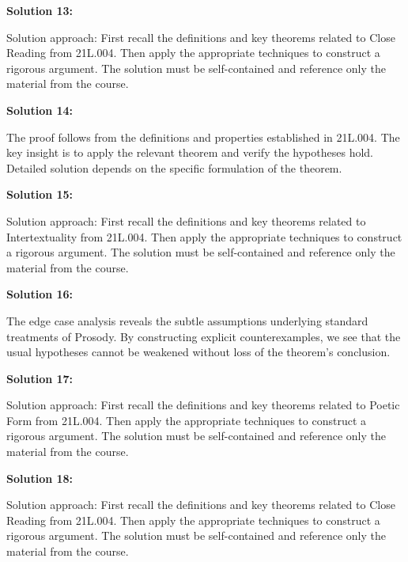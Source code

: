 \documentclass[12pt,a4paper]{exam}
\begin{document}
\vspace{0.5cm}

\textbf{Solution 13:}

Solution approach: First recall the definitions and key theorems related to Close Reading from 21L.004. Then apply the appropriate techniques to construct a rigorous argument. The solution must be self-contained and reference only the material from the course.

\vspace{0.5cm}

\textbf{Solution 14:}

The proof follows from the definitions and properties established in 21L.004. The key insight is to apply the relevant theorem and verify the hypotheses hold. Detailed solution depends on the specific formulation of the theorem.

\vspace{0.5cm}

\textbf{Solution 15:}

Solution approach: First recall the definitions and key theorems related to Intertextuality from 21L.004. Then apply the appropriate techniques to construct a rigorous argument. The solution must be self-contained and reference only the material from the course.

\vspace{0.5cm}

\textbf{Solution 16:}

The edge case analysis reveals the subtle assumptions underlying standard treatments of Prosody. By constructing explicit counterexamples, we see that the usual hypotheses cannot be weakened without loss of the theorem's conclusion.

\vspace{0.5cm}

\textbf{Solution 17:}

Solution approach: First recall the definitions and key theorems related to Poetic Form from 21L.004. Then apply the appropriate techniques to construct a rigorous argument. The solution must be self-contained and reference only the material from the course.

\vspace{0.5cm}

\textbf{Solution 18:}

Solution approach: First recall the definitions and key theorems related to Close Reading from 21L.004. Then apply the appropriate techniques to construct a rigorous argument. The solution must be self-contained and reference only the material from the course.
\end{document}
